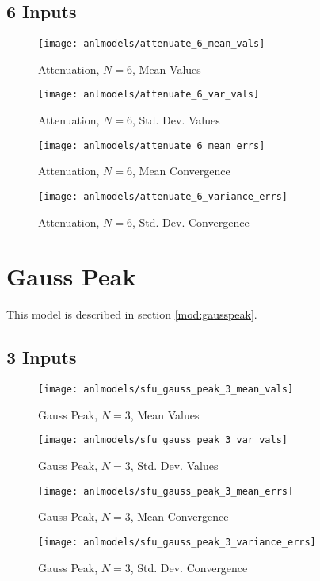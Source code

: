 \subsection{6 Inputs}
\begin{figure}[H]
  \centering
  \texttt{[image: anlmodels/attenuate\_6\_mean\_vals]}
  \caption{Attenuation, $N=6$, Mean Values}
  \label{fig:attenuate mean values 6}
\end{figure}
\begin{figure}[H]
  \centering
  \texttt{[image: anlmodels/attenuate\_6\_var\_vals]}
  \caption{Attenuation, $N=6$, Std. Dev. Values}
  \label{fig:attenuate var values 6}
\end{figure}

\begin{figure}[H]
  \centering
  \texttt{[image: anlmodels/attenuate\_6\_mean\_errs]}
  \caption{Attenuation, $N=6$, Mean Convergence}
  \label{fig:attenuate mean errors 6}
\end{figure}
\begin{figure}[H]
  \centering
  \texttt{[image: anlmodels/attenuate\_6\_variance\_errs]}
  \caption{Attenuation, $N=6$, Std. Dev. Convergence}
  \label{fig:attenuate var errors 6}
\end{figure}


\section{Gauss Peak}
This model is described in section \ref{mod:gausspeak}.
\subsection{3 Inputs}
\begin{figure}[H]
  \centering
  \texttt{[image: anlmodels/sfu\_gauss\_peak\_3\_mean\_vals]}
  \caption{Gauss Peak, $N=3$, Mean Values}
  \label{fig:gauss peak mean values 3}
\end{figure}
\begin{figure}[H]
  \centering
  \texttt{[image: anlmodels/sfu\_gauss\_peak\_3\_var\_vals]}
  \caption{Gauss Peak, $N=3$, Std. Dev. Values}
  \label{fig:gauss peak var values 3}
\end{figure}

\begin{figure}[H]
  \centering
  \texttt{[image: anlmodels/sfu\_gauss\_peak\_3\_mean\_errs]}
  \caption{Gauss Peak, $N=3$, Mean Convergence}
  \label{fig:gauss peak mean errors 3}
\end{figure}
\begin{figure}[H]
  \centering
  \texttt{[image: anlmodels/sfu\_gauss\_peak\_3\_variance\_errs]}
  \caption{Gauss Peak, $N=3$, Std. Dev. Convergence}
  \label{fig:gauss peak var errors 3}
\end{figure}

